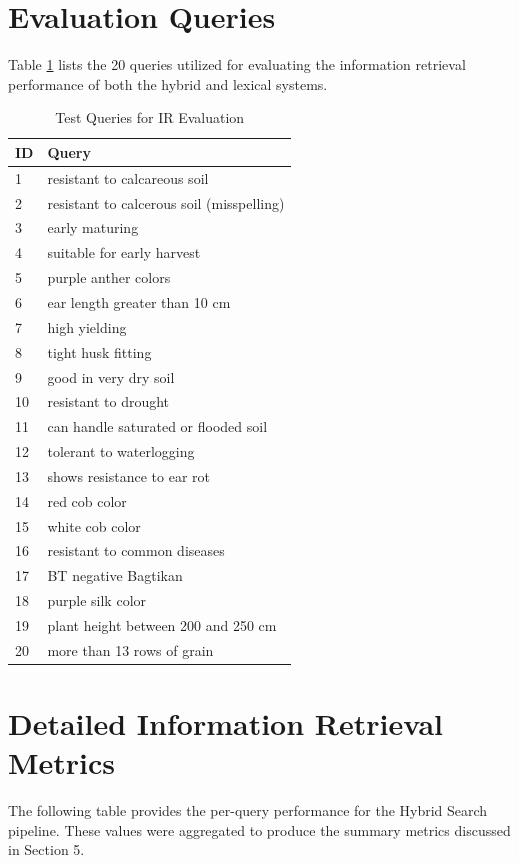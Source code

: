 \documentclass[journal]{./IEEE/IEEEtran}
\begin{document}
\section{Evaluation Queries}
Table \ref{tab:queries} lists the 20 queries utilized for evaluating the information retrieval performance of both the hybrid and lexical systems.

\begin{table}[htbp]
\caption{Test Queries for IR Evaluation}
\label{tab:queries}
\centering
\begin{tabular}{ll}
\hline
\textbf{ID} & \textbf{Query} \\ \hline
1 & resistant to calcareous soil \\
2 & resistant to calcerous soil (misspelling) \\
3 & early maturing \\
4 & suitable for early harvest \\
5 & purple anther colors \\
6 & ear length greater than 10 cm \\
7 & high yielding \\
8 & tight husk fitting \\
9 & good in very dry soil \\
10 & resistant to drought \\
11 & can handle saturated or flooded soil \\
12 & tolerant to waterlogging \\
13 & shows resistance to ear rot \\
14 & red cob color \\
15 & white cob color \\
16 & resistant to common diseases \\
17 & BT negative Bagtikan \\
18 & purple silk color \\
19 & plant height between 200 and 250 cm \\
20 & more than 13 rows of grain \\ \hline
\end{tabular}
\end{table}

\section{Detailed Information Retrieval Metrics}
The following table provides the per-query performance for the Hybrid Search pipeline. These values were aggregated to produce the summary metrics discussed in Section 5.
\end{document}
